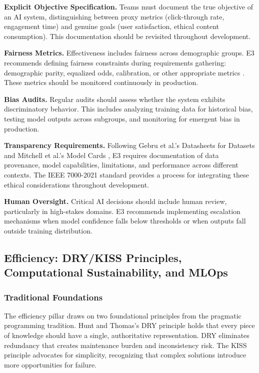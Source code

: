 \documentclass[11pt,a4paper]{article}
\begin{document}
\textbf{Explicit Objective Specification.} Teams must document the true objective of an AI system, distinguishing between proxy metrics (click-through rate, engagement time) and genuine goals (user satisfaction, ethical content consumption). This documentation should be revisited throughout development.

\textbf{Fairness Metrics.} Effectiveness includes fairness across demographic groups. E3 recommends defining fairness constraints during requirements gathering: demographic parity, equalized odds, calibration, or other appropriate metrics \cite{mitchell2019model}. These metrics should be monitored continuously in production.

\textbf{Bias Audits.} Regular audits should assess whether the system exhibits discriminatory behavior. This includes analyzing training data for historical bias, testing model outputs across subgroups, and monitoring for emergent bias in production.


\textbf{Transparency Requirements.} Following Gebru et al.'s Datasheets for Datasets \cite{gebru2021datasheets} and Mitchell et al.'s Model Cards \cite{mitchell2019model}, E3 requires documentation of data provenance, model capabilities, limitations, and performance across different contexts. The IEEE 7000-2021 standard \cite{ieee7000:2021} provides a process for integrating these ethical considerations throughout development.

\textbf{Human Oversight.} Critical AI decisions should include human review, particularly in high-stakes domains. E3 recommends implementing escalation mechanisms when model confidence falls below thresholds or when outputs fall outside training distribution.

\subsection{Efficiency: DRY/KISS Principles, Computational Sustainability, and MLOps}

\subsubsection{Traditional Foundations}

The efficiency pillar draws on two foundational principles from the pragmatic programming tradition. Hunt and Thomas's DRY principle \cite{hunt1999pragmatic} holds that every piece of knowledge should have a single, authoritative representation. DRY eliminates redundancy that creates maintenance burden and inconsistency risk. The KISS principle advocates for simplicity, recognizing that complex solutions introduce more opportunities for failure.
\end{document}
